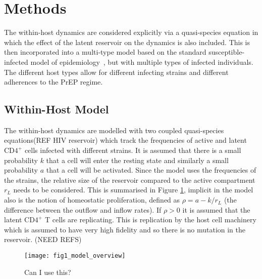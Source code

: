 \documentclass[DIV=15]{scrartcl}
\begin{document}
\section{Methods}
The within-host dynamics are considered explicitly via a   quasi-species equation in which the effect of the latent reservoir on the dynamics is also  included.  This is then incorporated into a multi-type model based on the standard susceptible-infected  model of epidemiology~\cite{diekmann2013}, but with multiple types of infected individuals. The different host types allow for different infecting strains and different adherences to the PrEP regime.


\subsection{Within-Host Model}


The within-host dynamics are modelled with two coupled quasi-species equations(REF HIV reservoir) which  track the frequencies of active and latent CD$4^+$ cells infected with different strains. It is assumed that there is a small probability $k$ that  a cell will enter the resting state and similarly a small probability $a$  that a cell will  be activated. Since the model uses the frequencies of the strains, the relative size of the reservoir compared to the active compartment $r_L$ needs to be considered. This is summarised in Figure \ref{Within Host Diagram}, implicit in the model also is  the notion of homeostatic proliferation, defined as $\rho = a - k/r_L$ (the difference between the outflow and inflow rates). If $\rho>0$
 it is assumed that
the latent CD$4^+$ T cells  are replicating. This is replication by the host cell machinery which is assumed  to have very high fidelity and so there is no mutation in the reservoir. (NEED REFS)
\begin{figure}[h]
 \begin{center}
 \texttt{[image: fig1\_model\_overview]}
 \end{center}
 \caption{Can I use this?}
 \label{Within Host Diagram}
 \end{figure}
 
\end{document}
